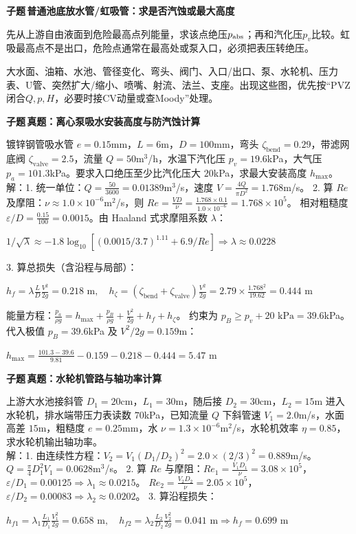 \documentclass[a4paper]{article}
\newcommand{\tagsec}[3]{\vspace{0.10pt}{\fontsize{5.05}{5.24}\selectfont\bfseries\color{#1}\colorbox{#1}{\color{white}\fontsize{4.00}{4.14}\selectfont #2}\,#3}\par}
\newcommand{\tagsecbg}[3]{\vspace{0.10pt}\colorbox{subbg}{\begin{minipage}{\dimexpr\linewidth-2\fboxsep\relax}\fontsize{5.05}{5.24}\selectfont\bfseries\color{#1}\colorbox{#1}{\color{white}\fontsize{4.00}{4.14}\selectfont #2}\,\color{black}#3\end{minipage}}\par}
\newcommand{\subq}[1]{\tagsecbg{subc}{子题}{#1}}
\newcommand{\idq}[1]{\tagsec{idc}{识别}{#1}}
\newcommand{\fmlb}[1]{\par\noindent\colorbox{bg}{\begin{minipage}{\dimexpr\linewidth-2\fboxsep\relax}\centering\fontsize{5.12}{5.42}\selectfont\ensuremath{\displaystyle #1}\end{minipage}}\par\vspace{0.10pt}}
\begin{document}
\begin{multicols*}{3}
\subq{普通池底放水管/虹吸管：求是否汽蚀或最大高度}
先从上游自由液面到危险最高点列能量，求该点绝压$p_{\rm abs}$；再和汽化压$p_v$比较。虹吸最高点不是出口，危险点通常在最高处或泵入口，必须把表压转绝压。
\idq{母题1图像关键词}
大水面、油箱、水池、管径变化、弯头、阀门、入口/出口、泵、水轮机、压力表、U管、突然扩大/缩小、喷嘴、射流、法兰、支座。出现这些图，优先按“PVZ闭合$Q,p,H$，必要时接CV动量或查Moody”处理。
\subq{真题：离心泵吸水安装高度与防汽蚀计算}
镀锌钢管吸水管 $e=0.15$mm，$L=6$m，$D=100$mm，弯头 $\zeta_{\text{bend}}=0.29$，带滤网底阀 $\zeta_{\text{valve}}=2.5$，流量 $Q=50$m$^3$/h，水温下汽化压 $p_v=19.6$kPa，大气压 $p_a=101.3$kPa。要求入口绝压至少比汽化压大 $20$kPa，求最大安装高度 $h_{\max}$。\\
解：1. 统一单位：$Q = \frac{50}{3600} = 0.01389$m$^3$/s，速度 $V = \frac{4Q}{\pi D^2} = 1.768$m/s。
2. 算 $Re$ 及摩阻：$\nu \approx 1.0\times 10^{-6}$m$^2$/s，则 $Re = \frac{VD}{\nu} = \frac{1.768\times 0.1}{1.0\times 10^{-6}} = 1.768\times 10^5$。
相对粗糙度 $\varepsilon/D = \frac{0.15}{100} = 0.0015$。由 Haaland 式求摩阻系数 $\lambda$：
\fmlb{1/\sqrt{\lambda} \approx -1.8 \log_{10} [ (0.0015/3.7)^{1.11} + 6.9/Re ] \Rightarrow \lambda \approx 0.0228}
3. 算总损失（含沿程与局部）：
\fmlb{h_f = \lambda \frac{L}{D} \frac{V^2}{2g} = 0.218\text{ m},\quad
h_\zeta = (\zeta_{\text{bend}} + \zeta_{\text{valve}}) \frac{V^2}{2g} = 2.79 \times \frac{1.768^2}{19.62} = 0.444\text{ m}}
能量方程：$\frac{p_a}{\rho g} = h_{\max} + \frac{p_B}{\rho g} + \frac{V^2}{2g} + h_f + h_\zeta$。
约束为 $p_B \ge p_v + 20\text{ kPa} = 39.6$kPa。代入极值 $p_B = 39.6$kPa 及 $V^2/2g = 0.159$m：
\fmlb{h_{\max} = \frac{101.3 - 39.6}{9.81} - 0.159 - 0.218 - 0.444 = 5.47\text{ m}}
\subq{真题：水轮机管路与轴功率计算}
上游大水池接斜管 $D_1=20$cm，$L_1=30$m，随后接 $D_2=30$cm，$L_2=15$m 进入水轮机，排水端带压力表读数 $70$kPa，已知流量 $Q$ 下斜管速 $V_1=2.0$m/s，水面高差 $15$m，粗糙度 $e=0.25$mm，水 $\nu=1.3\times10^{-6}$m$^2$/s，水轮机效率 $\eta=0.85$，求水轮机输出轴功率。\\
解：1. 由连续性方程：$V_2 = V_1 (D_1/D_2)^2 = 2.0\times (2/3)^2 = 0.889$m/s。
$Q = \frac{\pi}{4} D_1^2 V_1 = 0.0628$m$^3$/s。
2. 算 $Re$ 与摩阻：$Re_1 = \frac{V_1 D_1}{\nu} = 3.08\times 10^5$，$\varepsilon/D_1 = 0.00125 \Rightarrow \lambda_1 \approx 0.0215$。
$Re_2 = \frac{V_2 D_2}{\nu} = 2.05\times 10^5$，$\varepsilon/D_2 = 0.00083 \Rightarrow \lambda_2 \approx 0.0202$。
3. 算沿程损失：
\fmlb{h_{f1} = \lambda_1 \frac{L_1}{D_1} \frac{V_1^2}{2g} = 0.658\text{ m},\quad
h_{f2} = \lambda_2 \frac{L_2}{D_2} \frac{V_2^2}{2g} = 0.041\text{ m} \Rightarrow h_f = 0.699\text{ m}}

\end{multicols*}
\end{document}
